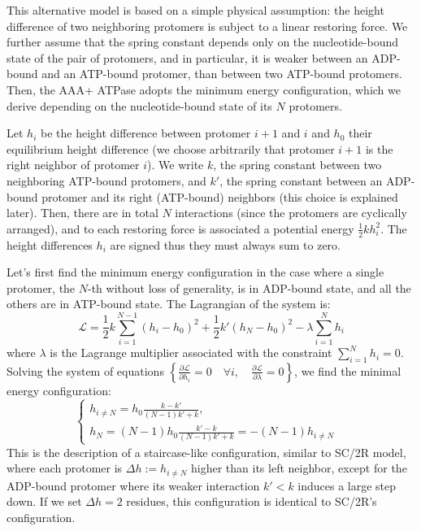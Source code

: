     This alternative model is based on a simple physical assumption: the height difference of two neighboring protomers is subject to a linear restoring force. We further assume that the spring constant depends only on the nucleotide-bound state of the pair of protomers, and in particular, it is weaker between an ADP-bound and an ATP-bound protomer, than between two ATP-bound protomers. Then, the AAA+ ATPase adopts the minimum energy configuration, which we derive depending on the nucleotide-bound state of its $N$ protomers.

    Let $h_i$ be the height difference between protomer $i+1$ and $i$ and $h_0$ their equilibrium height difference (we choose arbitrarily that protomer $i+1$ is the right neighbor of protomer $i$). We write $k$, the spring constant between two neighboring ATP-bound protomers, and $k'$, the spring constant between an ADP-bound protomer and its right (ATP-bound) neighbors (this choice is explained later). Then, there are in total $N$ interactions (since the protomers are cyclically arranged), and to each restoring force is associated a potential energy $\frac{1}{2}k h_i^2$. The height differences $h_i$ are signed thus they must always sum to zero. 
    
    Let's first find the minimum energy configuration in the case where a single protomer, the $N$-th without loss of generality, is in ADP-bound state, and all the others are in ATP-bound state. The Lagrangian of the system is:
    \begin{equation}
        \mathcal{L} = \frac{1}{2}k \sum_{i=1}^{N-1} (h_i - h_0)^2 + \frac{1}{2}k' (h_N - h_0)^2 - \lambda \sum_{i=1}^N h_i
    \end{equation}
    where $\lambda$ is the Lagrange multiplier associated with the constraint $\sum_{i=1}^N h_i = 0$. Solving the system of equations $\left\{\frac{\partial\mathcal{L}}{\partial h_i}=0 \quad \forall i, \quad \frac{\partial\mathcal{L}}{\partial \lambda}=0\right\}$, we find the minimal energy configuration:
    \begin{equation}
    \begin{cases}
        h_{i\neq N} = h_0 \frac{k-k'}{(N-1)k'+k}, & \\
        h_N = (N-1) h_0 \frac{k'-k}{(N-1)k'+k} = -(N-1) h_{i\neq N} &
    \end{cases}
    \end{equation}
    This is the description of a staircase-like configuration, similar to SC/2R model, where each protomer is $\Delta h := h_{i\neq N}$ higher than its left neighbor, except for the ADP-bound protomer where its weaker interaction $k'<k$ induces a large step down. If we set $\Delta h = 2$ residues, this configuration is identical to SC/2R's configuration. 
    
